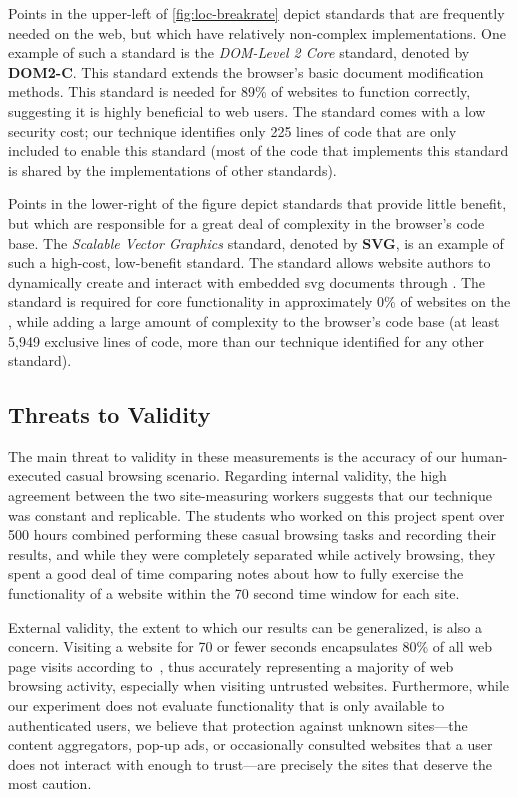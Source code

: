 Points in the upper-left of \ref{fig:loc-breakrate} depict standards that are
frequently needed on the web, but which have relatively non-complex
implementations.  One example of such a standard is the \textit{DOM-Level 2
Core} standard, denoted by \textbf{DOM2-C}.  This standard extends
the browser's basic document modification methods.  This standard is needed for
89\% of websites to function correctly, suggesting it is highly beneficial to
web users.  The standard comes with a low security cost; our technique
identifies only 225 lines of code that are only included to enable this
standard (most of the code that implements this standard is shared by the
implementations of other standards).

Points in the lower-right of the figure depict standards that provide
little benefit, but which are responsible for a great deal
of complexity in the browser's code base.  The \textit{Scalable Vector
Graphics} standard, denoted by \textbf{SVG}, is an example of
such a high-cost, low-benefit standard.  The standard allows website authors to
dynamically create and interact with embedded \gls{svg} documents through \JS.
The standard is required for core functionality in approximately 0\% of
websites on the \ATK, while adding a large amount of complexity to the
browser's code base (at least 5,949 exclusive lines of code, more than our
technique identified for any other standard).


\subsection{Threats to Validity}
The main threat to validity in these measurements is the accuracy of our
human-executed casual browsing scenario. Regarding internal validity, the high
agreement between the two site-measuring workers suggests that our technique
was constant and replicable.  The students who worked on this project spent
over 500 hours combined performing these casual browsing tasks and recording
their results, and while they were completely separated while actively
browsing, they spent a good deal of time comparing notes about how to fully
exercise the functionality of a website within the 70 second time window for
each site.

External validity, the extent to which our results can be generalized, is also
a concern. Visiting a website for 70 or fewer seconds encapsulates 80\% of all
web page visits according to~\cite{liu2010understanding}, thus accurately
representing a majority of web browsing activity, especially when visiting
untrusted websites. Furthermore, while our experiment does not evaluate
functionality that is only available to authenticated users, we believe that
protection against unknown sites---the content aggregators, pop-up ads, or
occasionally consulted websites that a user does not interact with enough to
trust---are precisely the sites that deserve the most caution.
